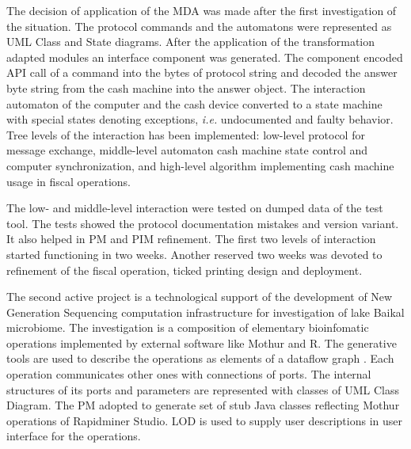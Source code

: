 \documentclass[runningheads]{llncs}
\begin{document}
The decision of application of the MDA was made after the first investigation of the situation.  The protocol commands and the automatons were represented as UML Class and State diagrams.  After the application of the transformation adapted modules an interface component was generated.  The component encoded API call of a command into the bytes of protocol string and decoded the answer byte string from the cash machine into the answer object.  The interaction automaton of the computer and the cash device converted to a state machine with special states denoting exceptions, \emph{i.e.} undocumented and faulty behavior.  Tree levels of the interaction has been implemented: low-level protocol for message exchange, middle-level automaton cash machine state control and computer synchronization, and high-level algorithm implementing cash machine usage in fiscal operations.

The low- and middle-level interaction were tested on dumped data of the test tool.  The tests showed the protocol documentation mistakes and version variant.  It also helped in PM and PIM refinement.  The first two levels of interaction started functioning in two weeks.  Another reserved two weeks was devoted to refinement of the fiscal operation, ticked printing design and deployment.

The second active project is a technological support of the development of New Generation Sequencing computation infrastructure for investigation of lake Baikal microbiome.  The investigation is a composition of elementary bioinfomatic operations implemented by external software like Mothur and R.  The generative tools are used to describe the operations as elements of a dataflow graph \cite{dataflow}.  Each operation communicates other ones with connections of ports.  The internal structures of its ports and parameters are represented with classes of UML Class Diagram.  The PM adopted to generate set of stub Java classes reflecting Mothur operations of Rapidminer Studio.  LOD is used to supply user descriptions in user interface for the operations.



\end{document}
